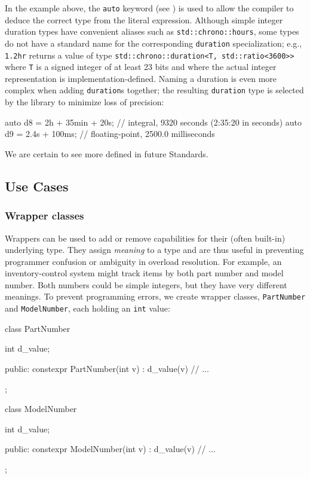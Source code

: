 \noindent In the example above, the \lstinline!auto! keyword (see ) is used to allow the compiler to deduce
the correct type from the literal expression. Although simple integer
duration types have convenient aliases such as
\lstinline!std::chrono::hours!, some types do not have a standard name for
the corresponding \lstinline!duration! specialization; e.g., \lstinline!1.2hr!
returns a value of type
\lstinline!std::chrono::duration<T,!~\lstinline!std::ratio<3600>>! where \lstinline!T! is a signed integer of at least 23 bits and
where the actual integer representation is implementation-defined.
Naming a duration is even more complex when adding \lstinline!duration!s
together; the resulting \lstinline!duration! type is selected by the
library to minimize loss of precision:

\begin{emcppslisting}[emcppsbatch=e13]
auto d8 = 2h + 35min + 20s;  // integral, 9320 seconds (2:35:20 in seconds)
auto d9 = 2.4s + 100ms;       // floating-point, 2500.0 milliseconds
\end{emcppslisting}

\noindent We are certain to see more  defined in future
Standards.

\subsection[Use Cases]{Use Cases}\label{use-cases-userdeflit}

\subsubsection[Wrapper classes]{Wrapper classes}\label{wrapper-classes}

Wrappers can be used to add or remove capabilities for their (often
built-in) underlying type. They assign \emph{meaning} to a type and are
thus useful in preventing programmer confusion or ambiguity in overload
resolution. For example, an inventory-control system might track items
by both part number and model number. Both numbers could be simple
integers, but they have very different meanings. To prevent programming
errors, we create wrapper classes, \lstinline!PartNumber! and
\lstinline!ModelNumber!, each holding an \lstinline!int! value:

\begin{emcppslisting}[emcppsbatch=e14]
class PartNumber
{
    int d_value;

public:
    constexpr PartNumber(int v) : d_value(v) { }
    // ...
};

class ModelNumber
{
    int d_value;

public:
    constexpr ModelNumber(int v) : d_value(v) { }
    // ...
};
\end{emcppslisting}

